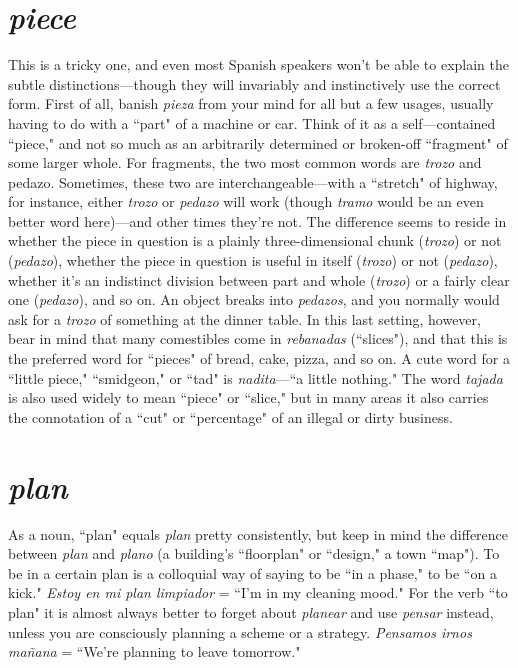 \section{\emph{piece}}

This is a tricky one, and even most Spanish speakers won't be
able to explain the subtle distinctions---though they will invariably
and instinctively use the correct form. First of all, banish \emph{pieza} from
your mind for all but a few usages, usually having to do with a ``part"
of a machine or car. Think of it as a self---contained ``piece," and not so
much as an arbitrarily determined or broken-off ``fragment" of some
larger whole.
For fragments, the two most common words are \emph{trozo} and
pedazo. Sometimes, these two are interchangeable---with a ``stretch"
of highway, for instance, either \emph{trozo} or \emph{pedazo} will work (though
\emph{tramo} would be an even better word here)---and other times they're
not. The difference seems to reside in whether the piece in question is
a plainly three-dimensional chunk (\emph{trozo}) or not (\emph{pedazo}), whether the
piece in question is useful in itself (\emph{trozo}) or not (\emph{pedazo}), whether it's
an indistinct division between part and whole (\emph{trozo}) or a fairly clear
one (\emph{pedazo}), and so on. An object breaks into \emph{pedazos}, and you normally would ask for a \emph{trozo} of something at the dinner table.
In this last setting, however, bear in mind that many comestibles come in \emph{rebanadas} (``slices"), and that this is the preferred word
for ``pieces" of bread, cake, pizza, and so on. A cute word for a ``little
piece," ``smidgeon," or ``tad" is \emph{nadita}---``a little nothing." The word
\emph{tajada} is also used widely to mean ``piece" or ``slice," but in many
areas it also carries the connotation of a ``cut" or ``percentage" of an
illegal or dirty business.

\section{\emph{plan}}

As a noun, ``plan" equals \emph{plan} pretty consistently, but keep in
mind the difference between \emph{plan} and \emph{plano} (a building's ``floorplan"
or ``design," a town ``map"). To be in a certain plan is a colloquial way
of saying to be ``in a phase," to be ``on a kick." \emph{Estoy en mi plan limpiador} = ``I'm in my cleaning mood." For the verb ``to plan" it is almost always better to forget about \emph{planear} and use \emph{pensar} instead,
unless you are consciously planning a scheme or a strategy. \emph{Pensamos
	irnos mañana} = ``We're planning to leave tomorrow."

